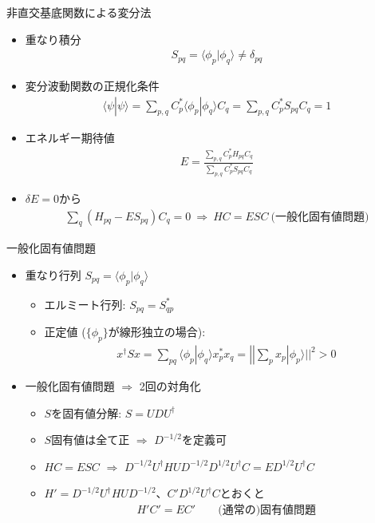 \begin{frame}[t,fragile]{非直交基底関数による変分法}
  \begin{itemize}
  \item 重なり積分
    \begin{align*}
      S_{pq} = \langle \phi_p | \phi_q \rangle \ne \delta_{pq}
    \end{align*}
  \item 変分波動関数の正規化条件
    \begin{align*}
      \langle \psi | \psi \rangle = \sum_{p,q} C_p^* \langle \phi_p | \phi_q \rangle C_q = \sum_{p,q} C_p^* S_{pq} C_q = 1
    \end{align*}
  \item エネルギー期待値
    \begin{align*}
      E = \frac{\sum_{p,q} C_p^* H_{pq} C_q}{\sum_{p,q} C_p^* S_{pq} C_q}
    \end{align*}
  \item $\delta E = 0$から
    \begin{align*}
      \sum_q (H_{pq} - E S_{pq}) C_q = 0 \ \Rightarrow \ HC = ESC \ \text{(一般化固有値問題)}
    \end{align*}
  \end{itemize}
\end{frame}

\begin{frame}[t,fragile]{一般化固有値問題}
  \begin{itemize}
  \item 重なり行列 $S_{pq} = \langle \phi_p | \phi_q \rangle$
    \begin{itemize}
      \item エルミート行列: $S_{pq} = S_{qp}^*$
      \item 正定値 ($\{\phi_p\}$が線形独立の場合):
        \begin{align*}
          x^\dagger S x = \sum_{pq} \langle \phi_p | \phi_q \rangle x_p^* x_q = || \sum_p x_p | \phi_p \rangle ||^2 > 0
        \end{align*}
    \end{itemize}
  \item 一般化固有値問題 $\Rightarrow$ 2回の対角化
    \begin{itemize}
      \item $S$を固有値分解: $S = U D U^\dagger$
      \item $S$固有値は全て正 $\Rightarrow$ $D^{-1/2}$を定義可
      \item $HC=ESC$ $\Rightarrow$ $D^{-1/2} U^\dagger H U D^{-1/2} D^{1/2} U^\dagger C = E D^{1/2} U^\dagger C$
      \item $H' = D^{-1/2} U^\dagger H U D^{-1/2}$、$C'D^{1/2} U^\dagger C$とおくと
        \begin{align*}
          H'C' = EC' \qquad \text{(通常の)固有値問題}
        \end{align*}
    \end{itemize}
  \end{itemize}
\end{frame}
